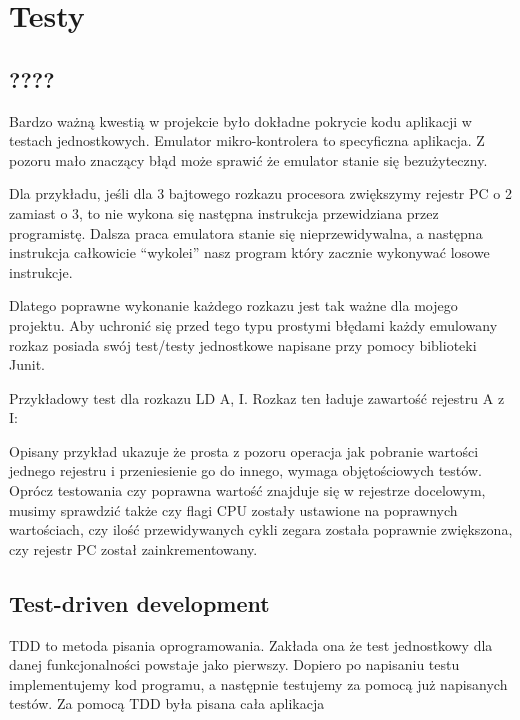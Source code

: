 \chapter{Testy}
		
	\section{????}
	Bardzo ważną kwestią w projekcie było dokładne pokrycie kodu aplikacji w testach jednostkowych. Emulator mikro-kontrolera to specyficzna aplikacja. Z pozoru mało znaczący błąd może sprawić że emulator stanie się bezużyteczny. 
	
	Dla przykładu, jeśli dla 3 bajtowego rozkazu procesora zwiększymy rejestr PC o 2 zamiast o 3, to nie wykona się następna instrukcja przewidziana przez programistę. Dalsza praca emulatora stanie się nieprzewidywalna, a następna instrukcja całkowicie “wykolei” nasz program który zacznie wykonywać losowe instrukcje. 
	
	Dlatego poprawne wykonanie każdego rozkazu jest tak ważne dla mojego projektu. Aby uchronić się przed tego typu prostymi błędami każdy emulowany rozkaz posiada swój test/testy jednostkowe napisane przy pomocy biblioteki Junit. 
	
	Przykładowy test dla rozkazu LD A, I. Rozkaz ten ładuje zawartość rejestru A z I:
	
	
	Opisany przykład ukazuje że prosta z pozoru operacja jak pobranie wartości jednego rejestru i przeniesienie go do innego, wymaga objętościowych testów. Oprócz testowania czy poprawna wartość znajduje się w rejestrze docelowym, musimy sprawdzić także czy flagi CPU zostały ustawione na poprawnych wartościach, czy ilość przewidywanych cykli zegara została poprawnie zwiększona, czy rejestr PC został zainkrementowany. 
	
	\section{Test-driven development}
	TDD to metoda pisania oprogramowania. Zakłada ona że test jednostkowy dla danej funkcjonalności powstaje jako pierwszy. Dopiero po napisaniu testu implementujemy kod programu, a następnie testujemy za pomocą już napisanych testów. Za pomocą TDD była pisana cała aplikacja